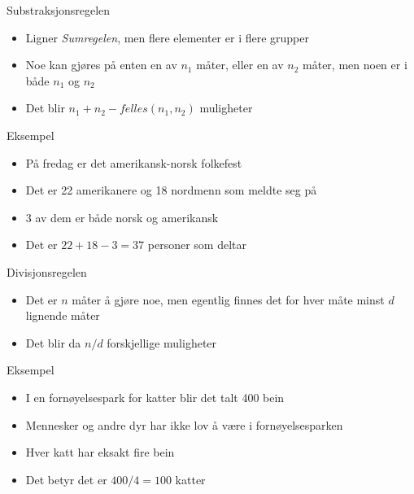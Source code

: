 \begin{frame}
\begin{block}{Substraksjonsregelen}
\begin{itemize}
\item Ligner \textit{Sumregelen}, men flere elementer er i flere grupper
\item Noe kan gjøres på enten en av $n_1$ måter, eller en av $n_2$ måter, men noen er i både $n_1$ og $n_2$
\item Det blir $n_1+n_2-felles(n_1,n_2)$ muligheter
\end{itemize}
\end{block}
\pause
\begin{block}{Eksempel}
\begin{itemize}
\item På fredag er det amerikansk-norsk folkefest
\item Det er 22 amerikanere og 18 nordmenn som meldte seg på
\item 3 av dem er både norsk og amerikansk
\item Det er $22+18-3=37$ personer som deltar
\end{itemize}
\end{block}
\end{frame}

\begin{frame}
\begin{block}{Divisjonsregelen}
\begin{itemize}
\item Det er $n$ måter å gjøre noe, men egentlig finnes det for hver måte minst $d$ lignende måter
\item Det blir da $n/d$ forskjellige muligheter
\end{itemize}
\end{block}
\pause
\begin{block}{Eksempel}
\begin{itemize}
\item I en fornøyelsespark for katter blir det talt 400 bein \item Mennesker og andre dyr har ikke lov å være i fornøyelsesparken
\item Hver katt har eksakt fire bein
\item Det betyr det er $400/4=100$ katter
\end{itemize}
\end{block}
\end{frame}

